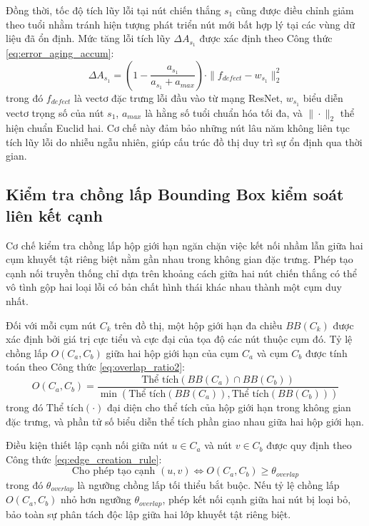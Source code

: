 Đồng thời, tốc độ tích lũy lỗi tại nút chiến thắng $s_1$ cũng được điều chỉnh giảm theo tuổi nhằm tránh hiện tượng phát triển nút mới bất hợp lý tại các vùng dữ liệu đã ổn định. Mức tăng lỗi tích lũy $\Delta A_{s_1}$ được xác định theo Công thức \ref{eq:error_aging_accum}:
\begin{equation}
\label{eq:error_aging_accum}
\Delta A_{s_1} = \left( 1 - \frac{a_{s_1}}{a_{s_1} + a_{max}} \right) \cdot \| f_{defect} - w_{s_1} \|_2^2
\end{equation}
trong đó $f_{defect}$ là vectơ đặc trưng lỗi đầu vào từ mạng ResNet, $w_{s_1}$ biểu diễn vectơ trọng số của nút $s_1$, $a_{max}$ là hằng số tuổi chuẩn hóa tối đa, và $\|\cdot\|_2$ thể hiện chuẩn Euclid hai. Cơ chế này đảm bảo những nút lâu năm không liên tục tích lũy lỗi do nhiễu ngẫu nhiên, giúp cấu trúc đồ thị duy trì sự ổn định qua thời gian.

\subsection{Kiểm tra chồng lấp Bounding Box kiểm soát liên kết cạnh}
\label{subsec:bounding_box_overlap}

Cơ chế kiểm tra chồng lấp hộp giới hạn ngăn chặn việc kết nối nhầm lẫn giữa hai cụm khuyết tật riêng biệt nằm gần nhau trong không gian đặc trưng. Phép tạo cạnh nối truyền thống chỉ dựa trên khoảng cách giữa hai nút chiến thắng có thể vô tình gộp hai loại lỗi có bản chất hình thái khác nhau thành một cụm duy nhất.

Đối với mỗi cụm nút $C_k$ trên đồ thị, một hộp giới hạn đa chiều $BB(C_k)$ được xác định bởi giá trị cực tiểu và cực đại của tọa độ các nút thuộc cụm đó. Tỷ lệ chồng lấp $O(C_a, C_b)$ giữa hai hộp giới hạn của cụm $C_a$ và cụm $C_b$ được tính toán theo Công thức \ref{eq:overlap_ratio2}:
\begin{equation}
\label{eq:overlap_ratio2}
O(C_a, C_b) = \frac{\text{Thể tích}(BB(C_a) \cap BB(C_b))}{\min \left( \text{Thể tích}(BB(C_a)), \text{Thể tích}(BB(C_b)) \right)}
\end{equation}
trong đó $\text{Thể tích}(\cdot)$ đại diện cho thể tích của hộp giới hạn trong không gian đặc trưng, và phần tử số biểu diễn thể tích phần giao nhau giữa hai hộp giới hạn.

Điều kiện thiết lập cạnh nối giữa nút $u \in C_a$ và nút $v \in C_b$ được quy định theo Công thức \ref{eq:edge_creation_rule}:
\begin{equation}
\label{eq:edge_creation_rule}
\text{Cho phép tạo cạnh }(u, v) \iff O(C_a, C_b) \ge \theta_{overlap}
\end{equation}
trong đó $\theta_{overlap}$ là ngưỡng chồng lấp tối thiểu bắt buộc. Nếu tỷ lệ chồng lấp $O(C_a, C_b)$ nhỏ hơn ngưỡng $\theta_{overlap}$, phép kết nối cạnh giữa hai nút bị loại bỏ, bảo toàn sự phân tách độc lập giữa hai lớp khuyết tật riêng biệt.


